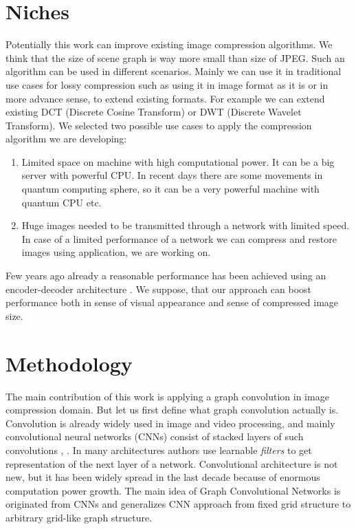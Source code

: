 \chapter{Niches}

Potentially this work can improve existing image compression algorithms. We think that the size of scene graph is way more small than size of JPEG. Such an algorithm can be used in different scenarios. Mainly we can use it in traditional use cases for lossy compression such as using it in image format as it is or in more advance sense, to extend existing formats. For example we can extend existing DCT (Discrete Cosine Transform) or DWT (Discrete Wavelet Transform). We selected two possible use cases to apply the compression algorithm we are developing:

\begin{enumerate}
    \item Limited space on machine with high computational power. It can be a big server with powerful CPU. In recent days there are some movements in quantum computing sphere, so it can be a very powerful machine with quantum CPU etc.
    \item Huge images needed to be transmitted through a network with limited speed. In case of a limited performance of a network we can compress and restore images using application, we are working on.
\end{enumerate}

Few years ago already a reasonable performance has been achieved using an encoder-decoder architecture \cite{Theis_Shi_Cunningham_Huszar_2017}. We suppose, that our approach can boost performance both in sense of visual appearance and sense of compressed image size.

\chapter{Methodology}

The main contribution of this work is applying a graph convolution in image compression domain. But let us first define what graph convolution actually is. Convolution is already widely used in image and video processing, and mainly convolutional neural networks (CNNs) consist of stacked layers of such convolutions \cite{Krizhevsky_Sutskever_Hinton_2017}, \cite{Simonyan_Zisserman_2015}. In many architectures authors use learnable \textit{filters} to get representation of the next layer of a network. Convolutional architecture is not new, but it has been widely spread in the last decade because of enormous computation power growth. The main idea of Graph Convolutional Networks is originated from CNNs and generalizes CNN approach from fixed grid structure to arbitrary grid-like graph structure.

